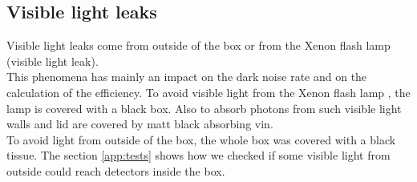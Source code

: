 \documentclass[a4paper, 11pt]{report}%
\newcommand{\xfl}{Xenon flash lamp }
\begin{document}
  \subsection{Visible light leaks}
  
  Visible light leaks come from outside of the box or from the \xfl (visible light leak).\\
  This phenomena has mainly an impact on the dark noise rate and on the calculation of the efficiency.
  To avoid visible light from the \xfl, the lamp is covered with a black box. Also to absorb photons from such visible light
  walls and lid are covered by matt black absorbing vin.\\
  To avoid light from outside of the box, the whole box was covered with a black tissue. The section \ref{app:tests} shows how we checked if 
  some visible light from outside could reach detectors inside the box. 
  
  \newpage 
  
\end{document}
